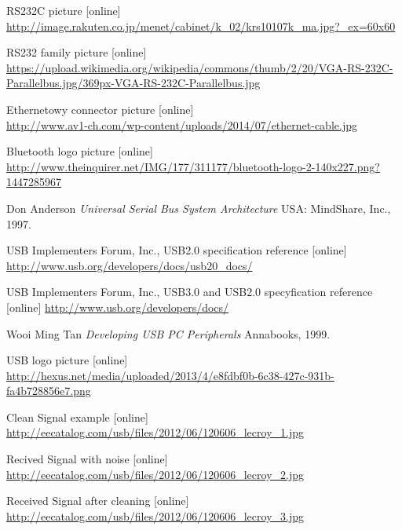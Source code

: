 \documentclass{BscUS}
\newcommand\blankpage{%
    \null
    \thispagestyle{empty}%
    \newpage}
\begin{document}
\newpage
\afterpage{\blankpage}
\begin{thebibliography}{1}

 RS232C picture [online]
\newline
\url{http://image.rakuten.co.jp/menet/cabinet/k_02/krs10107k_ma.jpg?_ex=60x60}

 RS232 family picture [online]
\newline
\url{https://upload.wikimedia.org/wikipedia/commons/thumb/2/20/VGA-RS-232C-Parallelbus.jpg/369px-VGA-RS-232C-Parallelbus.jpg}

 Ethernetowy connector picture [online] \\
\url{http://www.av1-ch.com/wp-content/uploads/2014/07/ethernet-cable.jpg}

 Bluetooth logo picture [online] \\
\url{http://www.theinquirer.net/IMG/177/311177/bluetooth-logo-2-140x227.png?1447285967}

 Don Anderson {\em Universal Serial Bus System Architecture } USA: MindShare, Inc., 1997.

 USB Implementers Forum, Inc., USB2.0 specification reference [online] 
\newline 
\url{http://www.usb.org/developers/docs/usb20_docs/}

 USB Implementers Forum, Inc., USB3.0 and USB2.0 specyfication reference [online] 
\newline 
\url{http://www.usb.org/developers/docs/}

 Wooi Ming Tan {\em Developing USB PC Peripherals } Annabooks, 1999.

 USB logo picture [online] \\
\url{http://hexus.net/media/uploaded/2013/4/e8fdbf0b-6c38-427c-931b-fa4b728856e7.png}

 Clean Signal example [online] \\
\url{http://eecatalog.com/usb/files/2012/06/120606_lecroy_1.jpg}

 Recived Signal with noise [online] \\
\url{http://eecatalog.com/usb/files/2012/06/120606_lecroy_2.jpg}

 Received Signal after cleaning [online]\\
\url{http://eecatalog.com/usb/files/2012/06/120606_lecroy_3.jpg}



\end{thebibliography}
\end{document}
